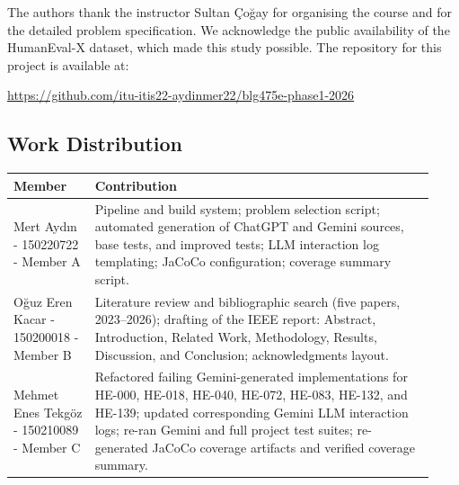 The authors thank the instructor Sultan \c{C}o\u{g}ay for organising the
course and for the detailed problem specification. We acknowledge the
public availability of the HumanEval-X dataset, which made this study
possible. The repository for this project is available at:
\begin{center}
\url{https://github.com/itu-itis22-aydinmer22/blg475e-phase1-2026}
\end{center}

\subsection*{Work Distribution}

\begin{tabular}{p{0.18\linewidth} p{0.75\linewidth}}
\toprule
Member & Contribution \\
\midrule
Mert Aydın - 150220722 - Member A &
Pipeline and build system; problem selection script; automated generation of
ChatGPT and Gemini sources, base tests, and improved tests; LLM interaction
log templating; JaCoCo configuration; coverage summary script. \\
\addlinespace
Oğuz Eren Kacar - 150200018 - Member B &
Literature review and bibliographic search (five papers, 2023--2026);
drafting of the IEEE report: Abstract, Introduction, Related Work,
Methodology, Results, Discussion, and Conclusion; acknowledgments layout. \\
\addlinespace
Mehmet Enes Tekgöz - 150210089 - Member C &
Refactored failing Gemini-generated implementations for HE-000, HE-018, HE-040, HE-072, HE-083, HE-132, and HE-139; updated corresponding Gemini LLM interaction logs; re-ran Gemini and full project test suites; re-generated JaCoCo coverage artifacts and verified coverage summary. \\
\bottomrule
\end{tabular}
